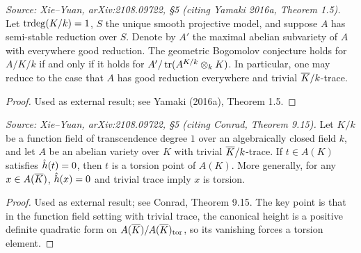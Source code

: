 \begin{theorem}
  \label{thm:yamakiReduction}
  \textit{Source: Xie--Yuan, arXiv:2108.09722, \S5 (citing Yamaki 2016a, Theorem 1.5).}
  Let \(\operatorname{trdeg}(K/k)=1\), \(S\) the unique smooth projective model, and suppose \(A\) has
  semi-stable reduction over \(S\).
  Denote by \(A'\) the maximal abelian subvariety of \(A\) with everywhere good reduction.
  The geometric Bogomolov conjecture holds for \(A/K/k\) if and only if it holds for
  \(A'/\operatorname{tr}(A^{K/k} \otimes_k K)\).
  In particular, one may reduce to the case that \(A\) has good reduction everywhere and
  trivial \(\overline{K}/k\)-trace.
\end{theorem}

\begin{proof}
  Used as external result; see Yamaki (2016a), Theorem 1.5.
\end{proof}

\begin{lemma}
  \label{lem:northcott}
  \textit{Source: Xie--Yuan, arXiv:2108.09722, \S5 (citing Conrad, Theorem 9.15).}
  Let \(K/k\) be a function field of transcendence degree \(1\) over an algebraically closed
  field \(k\), and let \(A\) be an abelian variety over \(K\) with trivial \(\overline{K}/k\)-trace.
  If \(t \in A(K)\) satisfies \(\hat{h}(t) = 0\), then \(t\) is a torsion point of \(A(K)\).
  More generally, for any \(x \in A(\overline{K})\), \(\hat{h}(x)=0\) and trivial trace imply \(x\) is
  torsion.
\end{lemma}

\begin{proof}
  Used as external result; see Conrad, Theorem 9.15.
  The key point is that in the function field setting with trivial trace, the canonical height
  is a positive definite quadratic form on \(A(\overline{K})/A(\overline{K})_{\rm tor}\), so its vanishing
  forces a torsion element.
\end{proof}

